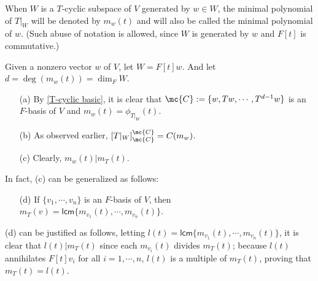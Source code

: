 \begin{nota}
    When $W$ is a $T$-cyclic subspace of $V$ generated by $w\in W$, the minimal polynomial of $T|_W$ will be denoted by $m_w(t)$ and will also be called the minimal polynomial of $w$.
    (Such abuse of notation is allowed, since $W$ is generated by $w$ and $F[t]$ is commutative.)
\end{nota}
\begin{obs}
    Given a nonzero vector $w$ of $V$, let $W=F[t]w$.
    And let $d=\deg(m_w(t))=\dim_F W$.
    \begin{enumerate}
        \item[(a)]
        {
            By \cref{T-cyclic basic}, it is clear that $\mc{C}:=\{w, Tw, \cdots, T^{d-1}w\}$ is an $F$-basis of $V$ and $m_w(t)=\phi_{T|_W}(t)$.
        }
        \item[(b)]
        {
            As observed earlier, $[T|_W]^\mc{C}_\mc{C}=C(m_w)$.
        }
        \item[(c)]
        {
            Clearly, $m_w(t)|m_T(t)$.
        }
    \end{enumerate}
    In fact, (c) can be generalized as follows:
    \begin{enumerate}
        \item[(d)]
        {
            If $\{v_1, \cdots, v_n\}$ is an $F$-basis of $V$, then $m_T(v)=\textsf{lcm}\{m_{v_1}(t), \cdots, m_{v_n}(t)\}$.
        }
    \end{enumerate}
    (d) can be justified as follows, letting $l(t)=\textsf{lcm}\{m_{v_1}(t), \cdots, m_{v_n}(t)\}$, it is clear that $l(t)|m_T(t)$ since each $m_{v_i}(t)$ divides $m_T(t)$; because $l(t)$ annihilates $F[t]v_i$ for all $i=1, \cdots, n$, $l(t)$ is a multiple of $m_T(t)$, proving that $m_T(t)=l(t)$.

\end{obs}

